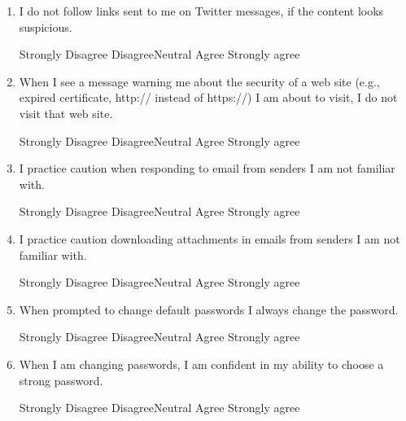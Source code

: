 \documentclass[doctor]{thesis} %
\theoremstyle{plain}
\begin{document}
\begin{enumerate}[noitemsep]
\item I do not follow links sent to me on Twitter messages, if the content looks suspicious.
\par Strongly Disagree \hspace{1cm} Disagree\hspace{1cm}Neutral\hspace{1cm} Agree\hspace{1cm} Strongly agree
\item When I see a message warning me about the security of a web site (e.g., expired certificate, http:// instead of https://) I am about to visit, I do not visit that web site.
\par Strongly Disagree \hspace{1cm} Disagree\hspace{1cm}Neutral\hspace{1cm} Agree\hspace{1cm} Strongly agree
\item I practice caution when responding to email from senders I am not familiar with.
\par Strongly Disagree \hspace{1cm} Disagree\hspace{1cm}Neutral\hspace{1cm} Agree\hspace{1cm} Strongly agree
\item I practice caution downloading attachments in emails from senders I am not familiar with.
\par Strongly Disagree \hspace{1cm} Disagree\hspace{1cm}Neutral\hspace{1cm} Agree\hspace{1cm} Strongly agree
\item When prompted to change default passwords I always change the password.
\par Strongly Disagree \hspace{1cm} Disagree\hspace{1cm}Neutral\hspace{1cm} Agree\hspace{1cm} Strongly agree
\item When I am changing passwords, I am confident in my ability to choose a strong password.
\par Strongly Disagree \hspace{1cm} Disagree\hspace{1cm}Neutral\hspace{1cm} Agree\hspace{1cm} Strongly agree

\end{enumerate}
\end{document}
